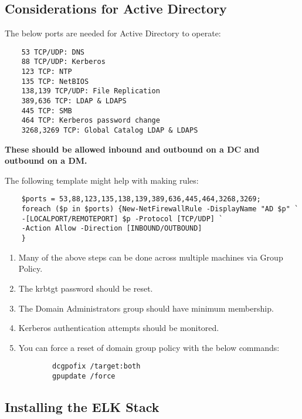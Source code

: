 \documentclass[12pt,letterpaper]{article}
\def\bf#1{\textbf{#1}}
\begin{document}
\pagebreak

\subsection{Considerations for Active Directory}
\label{subsec:adcon}

The below ports are needed for Active Directory to operate:
{ \color{iris} \begin{verbatim}
	53 TCP/UDP: DNS
	88 TCP/UDP: Kerberos
	123 TCP: NTP
	135 TCP: NetBIOS
	138,139 TCP/UDP: File Replication
	389,636 TCP: LDAP & LDAPS
	445 TCP: SMB
	464 TCP: Kerberos password change
	3268,3269 TCP: Global Catalog LDAP & LDAPS
\end{verbatim} }
\bf{These should be allowed inbound and outbound on a DC and outbound on a DM.}

The following template might help with making rules:
{ \color{iris} \begin{verbatim}
	$ports = 53,88,123,135,138,139,389,636,445,464,3268,3269;
	foreach ($p in $ports) {New-NetFirewallRule -DisplayName "AD $p" `
	-[LOCALPORT/REMOTEPORT] $p -Protocol [TCP/UDP] `
	-Action Allow -Direction [INBOUND/OUTBOUND]
	}
\end{verbatim} }

\begin{enumerate}
	\item Many of the above steps can be done across multiple machines via Group Policy.
	\item The krbtgt password should be reset.
	\item The Domain Administrators group should have minimum membership.
	\item Kerberos authentication attempts should be monitored.
	\item You can force a reset of domain group policy with the below commands:
		{ \color{iris} \begin{verbatim}
		dcgpofix /target:both
		gpupdate /force
		\end{verbatim} }
\end{enumerate}

\pagebreak

\subsection{Installing the ELK Stack}
\end{document}
